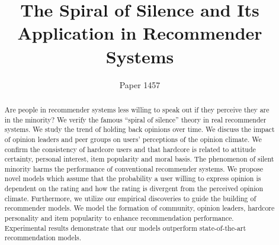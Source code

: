 \documentclass[sigconf]{acmart}
\begin{document}
\title{The Spiral of Silence and Its Application in Recommender Systems}
\author{Paper 1457}


\begin{abstract}
Are people in recommender systems less willing to speak out if they perceive they are in the minority? We verify the famous ``spiral of silence'' theory in real recommender systems. We study the trend of holding back opinions over time. We discuss the impact of opinion leaders and peer groups on users' perceptions of the opinion climate. We confirm the consistency of hardcore users and that hardcore is related to attitude certainty, personal interest, item popularity and moral basis. The phenomenon of silent minority harms the performance of conventional recommender systems. We propose novel models which assume that the probability a user willing to express opinion is dependent on the rating and how the rating is divergent from the perceived opinion climate. Furthermore, we utilize our empirical discoveries to guide the building of recommender models. We model the formation of community, opinion leaders, hardcore personality and item popularity to enhance recommendation performance.  Experimental results demonstrate that our models  outperform state-of-the-art recommendation models.

\end{abstract}
\end{document}
